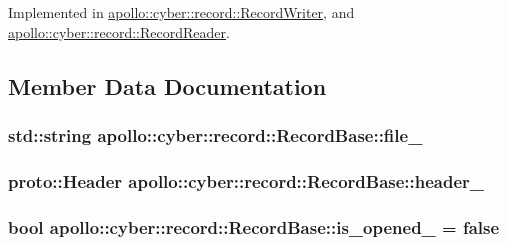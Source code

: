 Implemented in \hyperlink{classapollo_1_1cyber_1_1record_1_1RecordWriter_a1f547541dfc6df5803f1032e4f39fb3c}{apollo\-::cyber\-::record\-::\-Record\-Writer}, and \hyperlink{classapollo_1_1cyber_1_1record_1_1RecordReader_a5618fb95fdcf0660dc9ebdff3a14a869}{apollo\-::cyber\-::record\-::\-Record\-Reader}.



\subsection{Member Data Documentation}
\hypertarget{classapollo_1_1cyber_1_1record_1_1RecordBase_a3ce26ca2d17eec9a3d4e47749ace66b2}{
\subsubsection[{file\-\_\-}]{\setlength{\rightskip}{0pt plus 5cm}std\-::string apollo\-::cyber\-::record\-::\-Record\-Base\-::file\-\_\-\hspace{0.3cm}{\ttfamily [protected]}}}\label{classapollo_1_1cyber_1_1record_1_1RecordBase_a3ce26ca2d17eec9a3d4e47749ace66b2}
\hypertarget{classapollo_1_1cyber_1_1record_1_1RecordBase_af4b08d823c058d17eb38abe92d0ac7e7}{
\subsubsection[{header\-\_\-}]{\setlength{\rightskip}{0pt plus 5cm}proto\-::\-Header apollo\-::cyber\-::record\-::\-Record\-Base\-::header\-\_\-\hspace{0.3cm}{\ttfamily [protected]}}}\label{classapollo_1_1cyber_1_1record_1_1RecordBase_af4b08d823c058d17eb38abe92d0ac7e7}
\hypertarget{classapollo_1_1cyber_1_1record_1_1RecordBase_a122b01307f078dbb0e1baa5d57226c5f}{
\subsubsection[{is\-\_\-opened\-\_\-}]{\setlength{\rightskip}{0pt plus 5cm}bool apollo\-::cyber\-::record\-::\-Record\-Base\-::is\-\_\-opened\-\_\- = false\hspace{0.3cm}{\ttfamily [protected]}}}\label{classapollo_1_1cyber_1_1record_1_1RecordBase_a122b01307f078dbb0e1baa5d57226c5f}
